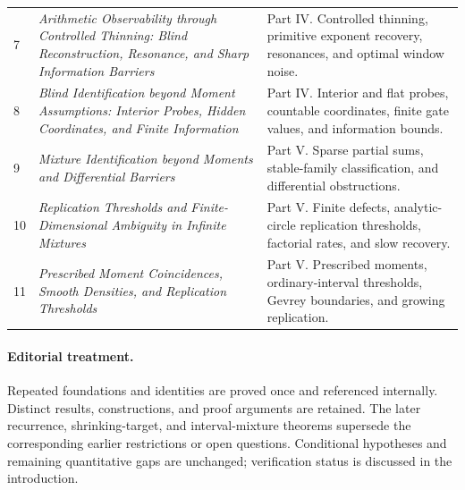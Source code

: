 \documentclass[11pt,letterpaper]{article}
\theoremstyle{definition}
\theoremstyle{remark}
\newcommand{\1}{\mathbf 1}
\begin{document}
\begin{longtable}{@{}p{}p{}p{}@{}}
\hypertarget{source:p07}{7} & \emph{Arithmetic Observability through Controlled Thinning: Blind Reconstruction, Resonance, and Sharp Information Barriers} & Part IV. Controlled thinning, primitive exponent recovery, resonances, and optimal window noise. \\
\hypertarget{source:p08}{8} & \emph{Blind Identification beyond Moment Assumptions: Interior Probes, Hidden Coordinates, and Finite Information} & Part IV. Interior and flat probes, countable coordinates, finite gate values, and information bounds. \\
\hypertarget{source:p09}{9} & \emph{Mixture Identification beyond Moments and Differential Barriers} & Part V. Sparse partial sums, stable-family classification, and differential obstructions. \\
\hypertarget{source:p10}{10} & \emph{Replication Thresholds and Finite-Dimensional Ambiguity in Infinite Mixtures} & Part V. Finite defects, analytic-circle replication thresholds, factorial rates, and slow recovery. \\
\hypertarget{source:p11}{11} & \emph{Prescribed Moment Coincidences, Smooth Densities, and Replication Thresholds} & Part V. Prescribed moments, ordinary-interval thresholds, Gevrey boundaries, and growing replication. \\
\end{longtable}
\endgroup

\paragraph{Editorial treatment.}
Repeated foundations and identities are proved once and referenced
internally. Distinct results, constructions, and proof arguments are
retained. The later recurrence, shrinking-target, and interval-mixture
theorems supersede the corresponding earlier restrictions or open
questions. Conditional hypotheses and remaining quantitative gaps are
unchanged; verification status is discussed in the introduction.
\clearpage
\end{document}
